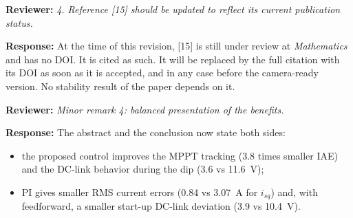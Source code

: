 \documentclass[11pt,a4paper]{article}
\newcommand{\rev}[1]{\par\medskip\noindent\textbf{Reviewer:} \emph{#1}\par\smallskip\noindent\textbf{Response:} }
\begin{document}
\rev{4. Reference [15] should be updated to reflect its current publication status.}
At the time of this revision, [15] is still under review at \emph{Mathematics} and has no DOI. It is
cited as such. It will be replaced by the full citation with its DOI as soon as it is accepted, and
in any case before the camera-ready version. No stability result of the paper depends on it.

\rev{Minor remark 4: balanced presentation of the benefits.}
The abstract and the conclusion now state both sides:
\begin{itemize}
\item the proposed control improves the MPPT tracking (3.8 times smaller IAE) and the DC-link
behavior during the dip (3.6 vs 11.6~V);
\item PI gives smaller RMS current errors (0.84 vs 3.07~A for $i_{sq}$) and, with feedforward, a smaller
start-up DC-link deviation (3.9 vs 10.4~V).
\end{itemize}
\end{document}

